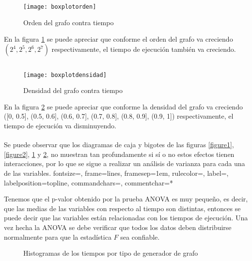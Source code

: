 \documentclass[a4paper, 11pt]{article}
\begin{document}
\subsection*{}
\begin{figure}[H]
\centering
\texttt{[image: boxplotorden]}
\caption{Orden del grafo contra tiempo} \label{figure3}
\end{figure}
En la figura \ref{figure3} se puede apreciar que conforme el orden del grafo va creciendo $(2^{4}, 2^{5},  2^{6},  2^{7})$ respectivamente, el tiempo de ejecución también va creciendo.


\subsection*{}
\begin{figure}[H]
\centering
\texttt{[image: boxplotdensidad]}
\caption{Densidad del grafo contra tiempo} \label{figure4}
\end{figure}
En la figura \ref{figure4} se puede apreciar que conforme la densidad del grafo va creciendo ([0, 0.5], (0.5, 0.6], (0.6, 0.7],  (0.7, 0.8], (0.8, 0.9], (0.9, 1]) respectivamente, el tiempo de ejecución va disminuyendo.
\\
\\
Se puede observar que los diagramas de caja y bigotes de las figuras \ref{figure1}, \ref{figure2}, \ref{figure3} y \ref{figure4}, no muestran tan profundamente si sí o no estos efectos tienen interacciones, por lo que se sigue a realizar un análisis de varianza para cada una de las variables.
{fontsize=\footnotesize,
 frame=lines,
 framesep=1em, 
 rulecolor=\color{Gray},
 label=,
 labelposition=topline,
 commandchars=\|\(\),
 commentchar=*  
}

Tenemos que el p-valor obtenido por la prueba ANOVA es muy pequeño, es decir, que las medias de las variables con respecto al tiempo son distintas, entonces se puede decir que las variables están relacionadas con los tiempos de ejecución. Una vez hecha la ANOVA se debe verificar que todos los datos deben distribuirse normalmente para que la estadística $F$ sea confiable.


\begin{figure}[H]
\centering
{}
\caption{Histogramas de los tiempos por tipo de generador de grafo} \label{figure5}
\end{figure}
\end{document}
